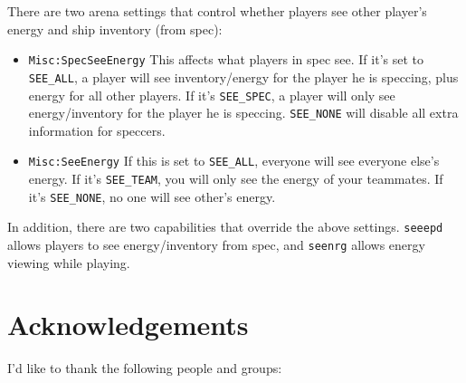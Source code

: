 \documentclass{article}
\begin{document}
There are two arena settings that control whether players see other
player's energy and ship inventory (from spec):

\begin{itemize}

\item{\texttt{Misc:SpecSeeEnergy}} This affects what players in spec
see. If it's set to \verb/SEE_ALL/, a player will see inventory/energy
for the player he is speccing, plus energy for all other players. If
it's \verb/SEE_SPEC/, a player will only see energy/inventory for the
player he is speccing.  \verb/SEE_NONE/ will disable all extra
information for speccers.

\item{\texttt{Misc:SeeEnergy}} If this is set to \verb/SEE_ALL/,
everyone will see everyone else's energy.  If it's \verb/SEE_TEAM/, you
will only see the energy of your teammates. If it's \verb/SEE_NONE/, no
one will see other's energy.

\end{itemize}

In addition, there are two capabilities that override the above
settings. \verb/seeepd/ allows players to see energy/inventory from
spec, and \verb/seenrg/ allows energy viewing while playing.


\section{Acknowledgements}

I'd like to thank the following people and groups:
\end{document}
